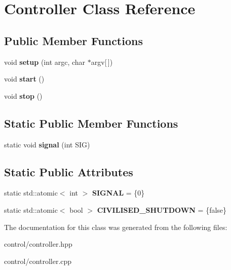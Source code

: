 \hypertarget{classController}{}\section{Controller Class Reference}
\label{classController}
\subsection*{Public Member Functions}
\begin{DoxyCompactItemize}
\item 
\mbox{\label{classController_af3c733ac55b6e4240899c995dd92a4dd}} 
void {\bfseries setup} (int argc, char $\ast$argv\mbox{[}$\,$\mbox{]})
\item 
\mbox{\label{classController_ad535ad74055e645b7f44b7feeb4e82a8}} 
void {\bfseries start} ()
\item 
\mbox{\label{classController_ad2abd6ee544cb1cb39705f31c6700f0c}} 
void {\bfseries stop} ()
\end{DoxyCompactItemize}
\subsection*{Static Public Member Functions}
\begin{DoxyCompactItemize}
\item 
\mbox{\label{classController_aea878ac8e8b3c0b90876efc898afe7e7}} 
static void {\bfseries signal} (int S\+IG)
\end{DoxyCompactItemize}
\subsection*{Static Public Attributes}
\begin{DoxyCompactItemize}
\item 
\mbox{\label{classController_a60d49e6e7564d5c7de0d121a518adf21}} 
static std\+::atomic$<$ int $>$ {\bfseries S\+I\+G\+N\+AL} = \{0\}
\item 
\mbox{\label{classController_a0aea87001970ceb43f8cd3882df4beb5}} 
static std\+::atomic$<$ bool $>$ {\bfseries C\+I\+V\+I\+L\+I\+S\+E\+D\+\_\+\+S\+H\+U\+T\+D\+O\+WN} = \{false\}
\end{DoxyCompactItemize}


The documentation for this class was generated from the following files\+:\begin{DoxyCompactItemize}
\item 
control/controller.\+hpp\item 
control/controller.\+cpp\end{DoxyCompactItemize}
